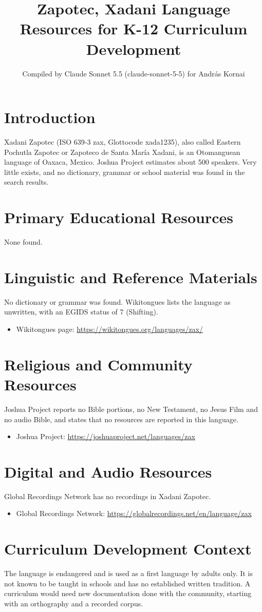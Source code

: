 \documentclass[12pt]{article}
\title{Zapotec, Xadani Language Resources for K-12 Curriculum Development}
\author{Compiled by Claude Sonnet 5.5 (claude-sonnet-5-5) for Andr\'as Kornai}
\date{}
\begin{document}
\maketitle

\section{Introduction}
Xadani Zapotec (ISO 639-3 zax, Glottocode xada1235), also called Eastern Pochutla Zapotec or Zapoteco de Santa Mar\'ia Xadani, is an Otomanguean language of Oaxaca, Mexico. Joshua Project estimates about 500 speakers. Very little exists, and no dictionary, grammar or school material was found in the search results.

\section{Primary Educational Resources}
None found.

\section{Linguistic and Reference Materials}
No dictionary or grammar was found. Wikitongues lists the language as unwritten, with an EGIDS status of 7 (Shifting).
\begin{itemize}
\item Wikitongues page: \url{https://wikitongues.org/languages/zax/}
\end{itemize}

\section{Religious and Community Resources}
Joshua Project reports no Bible portions, no New Testament, no Jesus Film and no audio Bible, and states that no resources are reported in this language.
\begin{itemize}
\item Joshua Project: \url{https://joshuaproject.net/languages/zax}
\end{itemize}

\section{Digital and Audio Resources}
Global Recordings Network has no recordings in Xadani Zapotec.
\begin{itemize}
\item Global Recordings Network: \url{https://globalrecordings.net/en/language/zax}
\end{itemize}

\section{Curriculum Development Context}
The language is endangered and is used as a first language by adults only. It is not known to be taught in schools and has no established written tradition. A curriculum would need new documentation done with the community, starting with an orthography and a recorded corpus.
\end{document}

